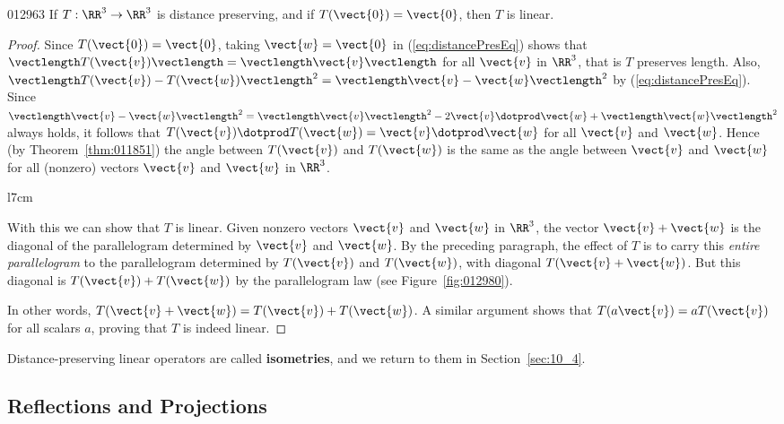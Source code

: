 \begin{theorem}{}{012963}
If $T : \RR^3 \to \RR^3$ is distance preserving, and if $T(\vect{0}) = \vect{0}$, then $T$ is linear.
\end{theorem}


\begin{proof}
Since $T(\vect{0}) = \vect{0}$, taking $\vect{w} = \vect{0}$ in (\ref{eq:distancePresEq}) shows that $\vectlength T(\vect{v})\vectlength = \vectlength\vect{v}\vectlength$ for all $\vect{v}$ in $\RR^3$, that is $T$ preserves length. Also, $\vectlength T(\vect{v}) - T(\vect{w})\vectlength^{2} = \vectlength\vect{v} - \vect{w}\vectlength^{2}$ by (\ref{eq:distancePresEq}). Since $\vectlength\vect{v} - \vect{w}\vectlength^{2} = \vectlength\vect{v}\vectlength^{2} - 2\vect{v} \dotprod \vect{w} + \vectlength\vect{w}\vectlength^{2}$ always holds, it follows that $T(\vect{v}) \dotprod T(\vect{w}) = \vect{v} \dotprod \vect{w}$ for all $\vect{v}$ and $\vect{w}$. Hence (by Theorem~\ref{thm:011851}) the angle between $T(\vect{v})$ and $T(\vect{w})$ is the same as the angle between $\vect{v}$ and $\vect{w}$ for all (nonzero) vectors $\vect{v}$ and $\vect{w}$ in $\RR^3$.


\begin{wrapfigure}{l}{7cm} 
\centering

\caption{\label{fig:012980}}
\end{wrapfigure}
With this we can show that $T$ is linear. Given nonzero vectors $\vect{v}$ and $\vect{w}$ in $\RR^3$, the vector $\vect{v} + \vect{w}$ is the diagonal of the parallelogram determined by $\vect{v}$ and $\vect{w}$. By the preceding paragraph, the effect of $T$ is to carry this \textit{entire parallelogram} to the parallelogram determined by $T(\vect{v})$ and $T(\vect{w})$, with diagonal $T(\vect{v} + \vect{w})$. But this diagonal is $T(\vect{v}) + T(\vect{w})$ by the parallelogram law (see Figure~\ref{fig:012980}).

In other words, $T(\vect{v} + \vect{w}) = T(\vect{v}) + T(\vect{w})$. A similar argument shows that $T(a\vect{v}) = aT(\vect{v})$ for all scalars $a$, proving that $T$ is indeed linear.
\end{proof}

\noindent Distance-preserving linear operators are called \textbf{isometries}, and we return to them in Section~\ref{sec:10_4}.


\subsection*{Reflections and Projections}

